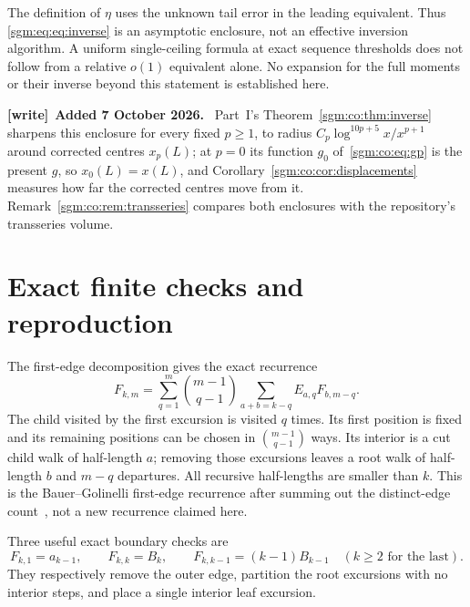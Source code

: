 \documentclass[11pt,letterpaper]{article}
\theoremstyle{remark}\newtheorem{remark}[theorem]{Remark}
\newenvironment{writenote}[1][]{\par\smallskip\begingroup\small
 \noindent\textbf{[write]}\if\relax\detokenize{#1}\relax\else~\textbf{#1.}\fi\ }%
 {\par\endgroup\smallskip}
\theoremstyle{definition}\newtheorem{definition}[theorem]{Definition}
\begin{document}
The definition of $\eta$ uses the unknown tail error in the leading equivalent. Thus \eqref{sgm:eq:eq:inverse} is an asymptotic enclosure, not an effective inversion algorithm. A uniform single-ceiling formula at exact sequence thresholds does not follow from a relative $o(1)$ equivalent alone. No expansion for the full moments or their inverse beyond this statement is established here.

\begin{writenote}[Added 7 October 2026]
Part~I's Theorem~\ref{sgm:co:thm:inverse} sharpens this enclosure for every fixed $p\ge1$, to radius $C_p\log^{10p+5}x/x^{p+1}$ around corrected centres $x_p(L)$; at $p=0$ its function $g_0$ of~\eqref{sgm:co:eq:gp} is the present $g$, so $x_0(L)=x(L)$, and Corollary~\ref{sgm:co:cor:displacements} measures how far the corrected centres move from it. Remark~\ref{sgm:co:rem:transseries} compares both enclosures with the repository's transseries volume.
\end{writenote}
\section{Exact finite checks and reproduction}\label{sgm:eq:sec:reproduction}
The first-edge decomposition gives the exact recurrence
\begin{equation}\label{sgm:eq:eq:recurrence}
 F_{k,m}=\sum_{q=1}^m\binom{m-1}{q-1}
       \sum_{a+b=k-q}E_{a,q}F_{b,m-q}.
\end{equation}
The child visited by the first excursion is visited $q$ times. Its first position is fixed and its remaining positions can be chosen in $\binom{m-1}{q-1}$ ways. Its interior is a cut child walk of half-length $a$; removing those excursions leaves a root walk of half-length $b$ and $m-q$ departures. All recursive half-lengths are smaller than $k$. This is the Bauer--Golinelli first-edge recurrence after summing out the distinct-edge count~\cite[Section 5.4]{bg}, not a new recurrence claimed here.

Three useful exact boundary checks are
\begin{equation}\label{sgm:eq:eq:boundaries}
 F_{k,1}=a_{k-1},\qquad F_{k,k}=B_k,\qquad
 F_{k,k-1}=(k-1)B_{k-1}\quad(k\ge2\text{ for the last}).
\end{equation}
They respectively remove the outer edge, partition the root excursions with no interior steps, and place a single interior leaf excursion.
\end{document}
